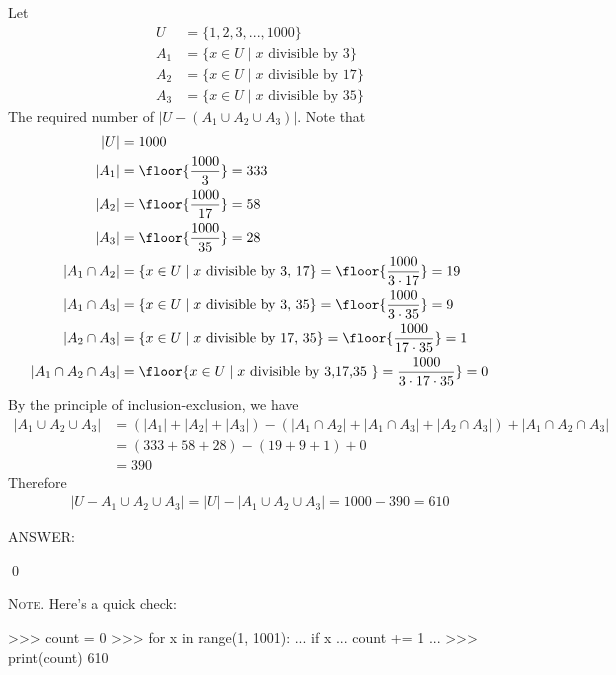 
Let
\begin{align*}
  U &= \{1, 2, 3, ..., 1000\} \\
  A_1 &= \{x \in U \mid x \text{ divisible by 3} \} \\
  A_2 &= \{x \in U \mid x \text{ divisible by 17} \} \\
  A_3 &= \{x \in U \mid x \text{ divisible by 35} \} 
\end{align*}
The required number of $|U - (A_1 \cup A_2 \cup A_3)|$.
Note that
\begin{align*}
  |U| &= 1000 \\
  |A_1| &= \floor{ \frac{1000}{3} } = 333 \\
  |A_2| &= \floor{ \frac{1000}{17} } = 58 \\
  |A_3| &= \floor{ \frac{1000}{35} } = 28 \\
  |A_1 \cap A_2| &= \{x \in U \mid x \text{ divisible by 3, 17}\} = \floor{\frac{1000}{3 \cdot 17}} = 19 \\
  |A_1 \cap A_3| &= \{x \in U \mid x \text{ divisible by 3, 35}\} = \floor{\frac{1000}{3 \cdot 35}} = 9 \\
  |A_2 \cap A_3| &= \{x \in U \mid x \text{ divisible by 17, 35}\} = \floor{\frac{1000}{17 \cdot 35}} = 1 \\
  |A_1 \cap A_2 \cap A_3| &= \floor{ x \in U \mid x \text{ divisible by 3,17,35 }\} = \frac{1000}{3 \cdot 17 \cdot 35}} = 0 
\end{align*}
By the principle of inclusion-exclusion, we have
\begin{align*}
  | A_1 \cup A_2 \cup A_3 |
  &= (|A_1| + |A_2| + |A_3|) - (|A_1 \cap A_2| + |A_1 \cap A_3| + |A_2 \cap A_3|) + |A_1 \cap A_2 \cap A_3| \\
  &= (333 + 58 + 28) - (19 + 9 + 1) + 0 \\
  &= 390
\end{align*}
Therefore
\begin{align*}
  | U -  A_1 \cup A_2 \cup A_3 |
  = |U| -  |A_1 \cup A_2 \cup A_3|
  = 1000 - 390
  = 610
\end{align*}

  
ANSWER:

\qed

\textsc{Note.}
Here's a quick check:
\begin{console}[fontsize=\footnotesize]
>>> count = 0
>>> for x in range(1, 1001):
...     if x %
...         count += 1
... 
>>> print(count)
610
\end{console}
